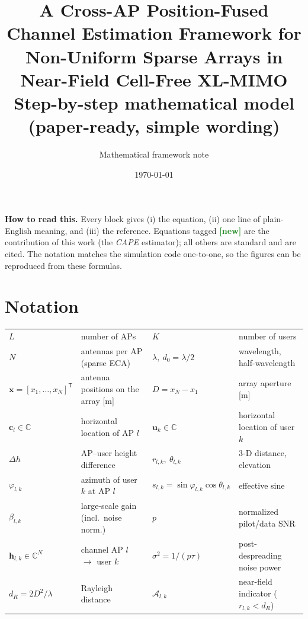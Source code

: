 \documentclass[11pt]{article}
\title{\textbf{A Cross-AP Position-Fused Channel Estimation Framework for\\
Non-Uniform Sparse Arrays in Near-Field Cell-Free XL-MIMO}\\[3pt]
\large Step-by-step mathematical model (paper-ready, simple wording)}
\author{Mathematical framework note}
\date{\today}
\newcommand{\C}{\mathbb{C}}
\newcommand{\T}{^{\mathsf{T}}}
\newcommand{\vh}{\mathbf{h}}
\begin{document}
\maketitle

\begin{keybox}
\textbf{How to read this.} Every block gives (i) the equation, (ii) one line of plain-English
meaning, and (iii) the reference. Equations tagged \textcolor{ForestGreen}{\textbf{[new]}} are the
contribution of this work (the \emph{CAPE} estimator); all others are standard and are cited. The
notation matches the simulation code one-to-one, so the figures can be reproduced from these
formulas.
\end{keybox}

\section{Notation}

\begin{center}
\renewcommand{\arraystretch}{1.12}
\begin{tabular}{@{}llll@{}}
\toprule
$L$ & number of APs & $K$ & number of users\\
$N$ & antennas per AP (sparse ECA) & $\lambda,\ d_0=\lambda/2$ & wavelength, half-wavelength\\
$\mathbf{x}=[x_1,\dots,x_N]\T$ & antenna positions on the array [m] & $D=x_N-x_1$ & array aperture [m]\\
$\mathbf{c}_l\in\C$ & horizontal location of AP $l$ & $\mathbf{u}_k\in\C$ & horizontal location of user $k$\\
$\Delta h$ & AP--user height difference & $r_{l,k},\ \theta_{l,k}$ & 3-D distance, elevation\\
$\varphi_{l,k}$ & azimuth of user $k$ at AP $l$ & $s_{l,k}=\sin\varphi_{l,k}\cos\theta_{l,k}$ & effective sine\\
$\beta_{l,k}$ & large-scale gain (incl.\ noise norm.) & $p$ & normalized pilot/data SNR\\
$\vh_{l,k}\in\C^{N}$ & channel AP $l$ $\to$ user $k$ & $\sigma^2=1/(p\tau)$ & post-despreading noise power\\
$d_R=2D^2/\lambda$ & Rayleigh distance & $\mathcal{A}_{l,k}$ & near-field indicator ($r_{l,k}<d_R$)\\
\bottomrule
\end{tabular}
\end{center}

\end{document}
